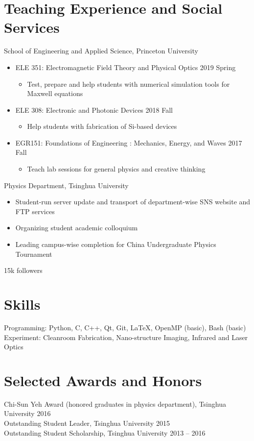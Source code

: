 \documentclass[11pt,letterpaper]{resume}
\begin{document}
\section{Teaching Experience and Social Services}
School of Engineering and Applied Science, Princeton University
\begin{itemize}
    \item ELE 351: Electromagnetic Field Theory and Physical Optics
    \hfill 2019 Spring
    \begin{itemize}
        \item Test, prepare and help students with 
        numerical simulation tools for Maxwell equations
    \end{itemize}
    \item ELE 308: Electronic and Photonic Devices
    \hfill 2018 Fall
    \begin{itemize}
        \item Help students with fabrication of Si-based devices
    \end{itemize}
    \item EGR151: Foundations of Engineering : Mechanics, Energy, and Waves
    \hfill 2017 Fall
    \begin{itemize}
        \item Teach lab sessions for general physics and creative thinking
    \end{itemize}
\end{itemize}\medskip

Physics Department, Tsinghua University
\begin{itemize}
    \item Student-run server update and transport of department-wise SNS 
    website and FTP services
    \item Organizing student academic colloquium 
    \item Leading campus-wise completion for China Undergraduate Physics 
    Tournament
\end{itemize}\medskip

15k followers

\section{Skills}
Programming: Python, C, C++, Qt, Git, \LaTeX, OpenMP (basic), Bash (basic)\\
Experiment: Cleanroom Fabrication, Nano-structure Imaging, 
Infrared and Laser Optics

\section{Selected Awards and Honors} 
Chi-Sun Yeh Award (honored graduates in physics department), Tsinghua University \hfill 2016 \\
Outstanding Student Leader, Tsinghua University \hfill 2015 \\
Outstanding Student Scholarship, Tsinghua University \hfill 2013 -- 2016\\
\end{document}
